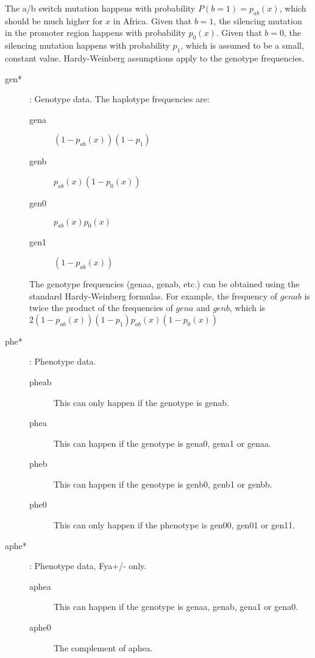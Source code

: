 \documentclass[a4paper]{article}
\begin{document}
The a/b switch mutation happens with probability $P(b=1)=p_{ab}(x)$, which should be much higher for $x$ in Africa. Given that $b=1$, the silencing mutation in the promoter region happens with probability $p_0(x)$. Given that $b=0$, the silencing mutation happens with probability $p_1$, which is assumed to be a small, constant value. Hardy-Weinberg assumptions apply to the genotype frequencies.
\begin{description}
    \item[gen*]: Genotype data. The haplotype frequencies are:
    \begin{description}
        \item[gena] $(1-p_{ab}(x))(1-p_1)$
        \item[genb] $p_{ab}(x)(1-p_0(x))$ 
        \item[gen0] $p_{ab}(x)p_0(x)$
        \item[gen1] $(1-p_{ab}(x))$
    \end{description}
    The genotype frequencies (genaa, genab, etc.) can be obtained using the standard Hardy-Weinberg formulas. For example, the frequency of $genab$ is twice the product of the frequencies of $gena$ and $genb$, which is $2(1-p_{ab}(x))(1-p_1)p_{ab}(x)(1-p_0(x))$
    \item[phe*]: Phenotype data.
    \begin{description}
        \item[pheab] This can only happen if the genotype is genab.
        \item[phea] This can happen if the genotype is gena0, gena1 or genaa.
        \item[pheb] This can happen if the genotype is genb0, genb1 or genbb.
        \item[phe0] This can only happen if the phenotype is gen00, gen01 or gen11.
    \end{description}
    \item[aphe*]: Phenotype data, Fya+/- only.
    \begin{description}
        \item[aphea] This can happen if the genotype is genaa, genab, gena1 or gena0.
        \item[aphe0] The complement of aphea.

\end{description}
\end{description}
\end{document}
